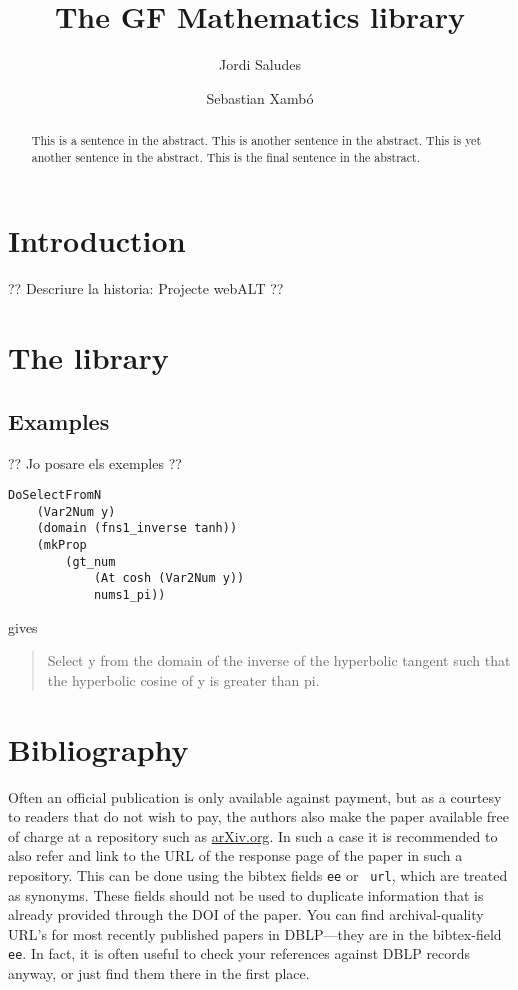 \documentclass[adraft,copyright,creativecommons]{eptcs}
\title{The GF Mathematics library}
\author{Jordi Saludes
\institute{UPC}
\institute{Sistemes Avan\c cats de Control}\\
\email{jordi.saludes@upc.edu}
\and
Sebastian Xamb\'o
\institute{Universitat Polit\`ecnica de Catalunya.\\Barcelona, Spain}
\email{\quad ??}
}
\begin{document}
\lstset{language=GF}
\maketitle

\begin{abstract}
This is a sentence in the abstract.
This is another sentence in the abstract.
This is yet another sentence in the abstract.
This is the final sentence in the abstract.
\end{abstract}

\section{Introduction} %
\label{sec:introduction}


?? Descriure la historia: Projecte webALT ??


\section{The library} %
\label{sec:the_library}

\subsection{Examples} %
\label{sub:examples}
?? Jo posare els exemples ??

\begin{lstlisting}
DoSelectFromN
	(Var2Num y)
	(domain (fns1_inverse tanh))
	(mkProp 
		(gt_num 
			(At cosh (Var2Num y))
			nums1_pi))	
\end{lstlisting}
gives
\begin{quote}
Select y from the domain of the inverse of the hyperbolic tangent such that
the hyperbolic cosine of y is greater than pi.
\end{quote}









\section{Bibliography}

Often an official publication is only available against payment, but
as a courtesy to readers that do not wish to pay, the authors also
make the paper available free of charge at a repository such as
\url{arXiv.org}. In such a case it is recommended to also refer and
link to the URL of the response page of the paper in such a
repository.  This can be done using the bibtex fields {\tt ee} or {\tt
url}, which are treated as synonyms.  These fields should not be used
to duplicate information that is already provided through the DOI of
the paper.
You can find archival-quality URL's for most recently published papers
in DBLP---they are in the bibtex-field {\tt ee}. In fact, it is often
useful to check your references against DBLP records anyway, or just find
them there in the first place.


\nocite{*}


\end{document}

